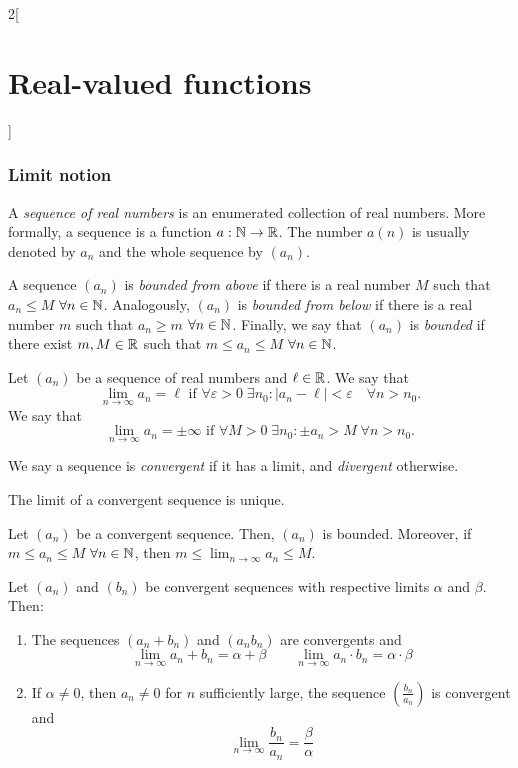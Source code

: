\documentclass[../../../main.tex]{subfiles}
\begin{document}
\begin{multicols}{2}[\section{Real-valued functions}]
  \subsubsection{Limit notion}
  \begin{definition}
    A \emph{sequence of real numbers} is an enumerated collection of real numbers. More formally, a sequence is a function $a:\mathbb{N}\rightarrow\mathbb{R}$. The number $a(n)$ is usually denoted by $a_n$ and the whole sequence by $(a_n)$.
  \end{definition}
  \begin{definition}
    A sequence $(a_n)$ is \emph{bounded from above} if there is a real number $M$ such that $a_n\leq M$ $\forall n\in\mathbb{N}$.
    Analogously, $(a_n)$ is \emph{bounded from below} if there is a real number $m$ such that $a_n\geq m$ $\forall n\in\mathbb{N}$.
    Finally, we say that $(a_n)$ is \emph{bounded} if there exist $m,M\in\mathbb{R}$ such that $m\leq a_n\leq M$ $\forall n\in\mathbb{N}$.
  \end{definition}
  \begin{definition}[Limit]
    Let $(a_n)$ be a sequence of real numbers and $\ell\in\mathbb{R}$. We say that $$\lim_{n\to\infty} a_n=\ell\text{ if }\forall\varepsilon>0\;\exists n_0:|a_n-\ell|<\varepsilon\quad\forall n>n_0.$$
    We say that $$\lim_{n\to\infty} a_n=\pm\infty\text{ if }\forall M>0\;\exists n_0:\pm a_n>M\;\forall n>n_0.$$
  \end{definition}
  \begin{definition}
    We say a sequence is \emph{convergent} if it has a limit, and \emph{divergent} otherwise.
  \end{definition}
  \begin{lemma}
    The limit of a convergent sequence is unique.
  \end{lemma}
  \begin{lemma}
    Let $(a_n)$ be a convergent sequence. Then, $(a_n)$ is bounded. Moreover, if $m\leq a_n\leq M$ $\forall n\in\mathbb{N}$, then $\displaystyle m\leq \lim_{n\to\infty} a_n\leq M$.
  \end{lemma}
  \begin{lemma}
    Let $(a_n)$ and $(b_n)$ be convergent sequences with respective limits $\alpha$ and $\beta$. Then:
    \begin{enumerate}
      \item The sequences $(a_n+b_n)$ and $(a_nb_n)$ are convergents and $$\lim_{n\to\infty} a_n+b_n=\alpha+\beta\qquad\lim_{n\to\infty} a_n\cdot b_n=\alpha\cdot \beta$$
      \item If $\alpha\ne 0$, then $a_n\ne 0$ for $n$ sufficiently large, the sequence $\displaystyle\left(\frac{b_n}{a_n}\right)$ is convergent and $$\lim_{n\to\infty}\frac{b_n}{a_n}=\frac{\beta}{\alpha}$$

\end{enumerate}
\end{lemma}
\end{multicols}
\end{document}
